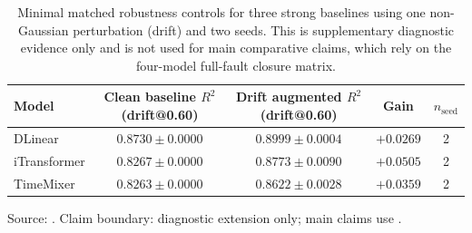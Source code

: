 ﻿\documentclass[review,1p,times]{elsarticle}
\begin{document}
\begin{table}[t]
\centering
\caption{Minimal matched robustness controls for three strong baselines using one non-Gaussian perturbation (drift) and two seeds. This is supplementary diagnostic evidence only and is not used for main comparative claims, which rely on the four-model full-fault closure matrix.}
\label{tab:fairness_drift_2seed}
\label{tab:itransformer_augmented}
\begin{tabular}{lcccc}
\toprule
Model & Clean baseline $R^2$ (drift@0.60) & Drift augmented $R^2$ (drift@0.60) & Gain & $n_{\text{seed}}$ \\
\midrule
DLinear & $0.8730 \pm 0.0000$ & $\mathbf{0.8999 \pm 0.0004}$ & $+0.0269$ & 2 \\
iTransformer & $0.8267 \pm 0.0000$ & $\mathbf{0.8773 \pm 0.0090}$ & $+0.0505$ & 2 \\
TimeMixer & $0.8263 \pm 0.0000$ & $\mathbf{0.8622 \pm 0.0028}$ & $+0.0359$ & 2 \\
\bottomrule
\end{tabular}
\vspace{3pt}
\footnotesize Source: . Claim boundary: diagnostic extension only; main claims use .
\end{table}
\end{document}
